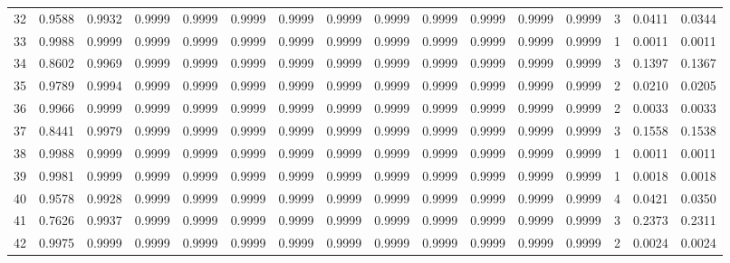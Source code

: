 \begin{tabular}{lrrrrrrrrrrrrrrr}
32  &      0.9588 &  0.9932 &  0.9999 &  0.9999 &  0.9999 &  0.9999 &  0.9999 &  0.9999 &  0.9999 &  0.9999 &   0.9999 &     0.9999 &      3 &                    0.0411 &                     0.0344 \\
33  &      0.9988 &  0.9999 &  0.9999 &  0.9999 &  0.9999 &  0.9999 &  0.9999 &  0.9999 &  0.9999 &  0.9999 &   0.9999 &     0.9999 &      1 &                    0.0011 &                     0.0011 \\
34  &      0.8602 &  0.9969 &  0.9999 &  0.9999 &  0.9999 &  0.9999 &  0.9999 &  0.9999 &  0.9999 &  0.9999 &   0.9999 &     0.9999 &      3 &                    0.1397 &                     0.1367 \\
35  &      0.9789 &  0.9994 &  0.9999 &  0.9999 &  0.9999 &  0.9999 &  0.9999 &  0.9999 &  0.9999 &  0.9999 &   0.9999 &     0.9999 &      2 &                    0.0210 &                     0.0205 \\
36  &      0.9966 &  0.9999 &  0.9999 &  0.9999 &  0.9999 &  0.9999 &  0.9999 &  0.9999 &  0.9999 &  0.9999 &   0.9999 &     0.9999 &      2 &                    0.0033 &                     0.0033 \\
37  &      0.8441 &  0.9979 &  0.9999 &  0.9999 &  0.9999 &  0.9999 &  0.9999 &  0.9999 &  0.9999 &  0.9999 &   0.9999 &     0.9999 &      3 &                    0.1558 &                     0.1538 \\
38  &      0.9988 &  0.9999 &  0.9999 &  0.9999 &  0.9999 &  0.9999 &  0.9999 &  0.9999 &  0.9999 &  0.9999 &   0.9999 &     0.9999 &      1 &                    0.0011 &                     0.0011 \\
39  &      0.9981 &  0.9999 &  0.9999 &  0.9999 &  0.9999 &  0.9999 &  0.9999 &  0.9999 &  0.9999 &  0.9999 &   0.9999 &     0.9999 &      1 &                    0.0018 &                     0.0018 \\
40  &      0.9578 &  0.9928 &  0.9999 &  0.9999 &  0.9999 &  0.9999 &  0.9999 &  0.9999 &  0.9999 &  0.9999 &   0.9999 &     0.9999 &      4 &                    0.0421 &                     0.0350 \\
41  &      0.7626 &  0.9937 &  0.9999 &  0.9999 &  0.9999 &  0.9999 &  0.9999 &  0.9999 &  0.9999 &  0.9999 &   0.9999 &     0.9999 &      3 &                    0.2373 &                     0.2311 \\
42  &      0.9975 &  0.9999 &  0.9999 &  0.9999 &  0.9999 &  0.9999 &  0.9999 &  0.9999 &  0.9999 &  0.9999 &   0.9999 &     0.9999 &      2 &                    0.0024 &                     0.0024 \\

\end{tabular}
